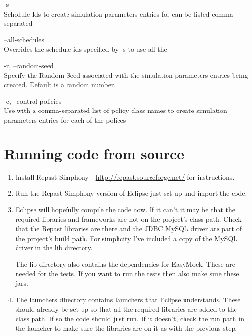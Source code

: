 \begin{description}
\item -s\\
  Schedule Ids to create simulation parameters entries for can be listed comma separated

\item --all-schedules\\
  Overrides the schedule ids specified by -s to use all the 

\item -r, --random-seed\\
  Specify the Random Seed associated with the simulation parameters entries being created. Default is a random number.
  
\item   -c, --control-policies\\
  Use with a comma-separated list of policy class names to create simulation parameters entries for each of the polices
\end{description}

\section{Running code from source}

\begin{enumerate}
\item Install Repast Simphony - \url{http://repast.sourceforge.net/} for instructions.

\item Run the Repast Simphony version of Eclipse just set up and import the code.

\item Eclipse will hopefully compile the code now. If it can't it may be that the required libraries and frameworks are not on the project's class path. Check that the Repast libraries are there and the JDBC MySQL driver are part of the project's build path. For simplicity I've included a copy of the MySQL driver in the lib directory. 

The lib directory also contains the dependencies for EasyMock. These are needed for the tests. If you want to run the tests then also make sure these jars.

\item The launchers directory contains launchers that Eclipse understands. These should already be set up so that all the required libraries are added to the class path. If so the code should just run. If it doesn't, check the run path in the launcher to make sure the libraries are on it as with the previous step.
\end{enumerate}

